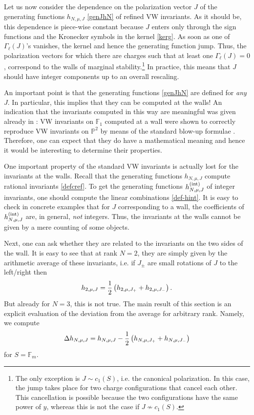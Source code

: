 \documentclass[12pt,letterpaper]{JHEP3}
\def\be{\begin{equation}}
\def\ee{\end{equation}}
\def\({\left(}
\def\){\right)}
\def\hf{{1\over 2}}
\newcommand{\IF}{\mathds{F}}
\newcommand{\IP}{\mathds{P}}
\def\hint{h^{\rm (int)}}
\begin{document}
Let us now consider the dependence on the polarization vector $J$ of the generating functions $h_{N,\mu,J}$ \eqref{genJhN}
of refined VW invariants.
As it should be, this dependence is piece-wise constant because $J$ enters only through the sign functions and the Kronecker symbols
in the kernel \eqref{kerg}. As soon as one of $\Gamma_\ell(J)$'s vanishes, the kernel and hence the generating function jump.
Thus, the polarization vectors for which there are charges such that at least one $\Gamma_\ell(J)=0$, 
correspond to the walls of marginal stability.\footnote{The only exception is $J\sim c_1(S)$, i.e. the canonical polarization.
	In this case, the jump takes place for two charge configurations that cancel each other.
	This cancellation is possible because the two configurations have the same power of $y$, 
	whereas this is not the case if $J\not\sim c_1(S)$.}
In practice, this means that $J$ should have integer components up to an overall rescaling.

An important point is that the generating functions \eqref{genJhN} are defined for {\it any} $J$.
In particular, this implies that they can be computed at the walls!
An indication that the invariants computed in this way are meaningful was given already in \cite{Alexandrov:2020dyy}:
VW invariants on $\IF_1$ computed at a wall were shown to correctly reproduce VW invariants on $\IP^2$ 
by means of the standard blow-up formulae \cite{Yoshioka:1996,0961.14022,Li:1998nv}.
Therefore, one can expect that they do have a mathematical meaning 
and hence it would be interesting to determine their properties.

One important property of the standard VW invariants is actually lost for the invariants at the walls. 
Recall that the generating functions $h_{N,\mu,J}$ compute rational invariants \eqref{defcref}.
To get the generating functions $\hint_{N,\mu,J}$ of integer invariants, 
one should compute the linear combinations \eqref{def-hint}.
It is easy to check in concrete examples that for $J$ corresponding to a wall, 
the coefficients of $\hint_{N,\mu,J}$ are, in general, {\it not} integers.
Thus, the invariants at the walls cannot be given by a mere counting of some objects.

Next, one can ask whether they are related to the invariants on the two sides of the wall.
It is easy to see that at rank $N=2$, they are simply given by the arithmetic average of these invariants, 
i.e. if $J_\pm$ are small rotations of $J$ to the left/right then
\be 
h_{2,\mu,J}=\hf\(h_{2,\mu,J_+}+h_{2,\mu,J_-}\).
\label{Delh2}
\ee 
But already for $N=3$, this is not true.
The main result of this section is an explicit evaluation of the deviation from the average for arbitrary rank.
Namely, we compute 
\be 
\Delta h_{N,\mu,J}=h_{N,\mu,J}-\hf\(h_{N,\mu,J_+}+h_{N,\mu,J_-}\)
\label{defDh}
\ee 
for $S=\IF_m$.
\end{document}
